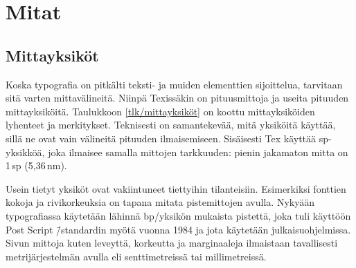 \section{Mitat}
\label{luku/mitat}

\subsection{Mittayksiköt}

Koska typografia on pitkälti teksti- ja muiden elementtien sijoittelua,
tarvitaan sitä varten mittavälineitä. Niinpä Texissäkin on pituusmittoja
ja useita pituuden mittayksiköitä. Taulukkoon \ref{tlk/mittayksiköt} on
koottu mittayksiköiden lyhenteet ja merkitykset. Teknisesti on
samantekevää, mitä yksiköitä käyttää, sillä ne ovat vain välineitä
pituuden ilmaisemiseen. Sisäisesti Tex käyttää sp-yksikköä, joka
ilmaisee samalla mittojen tarkkuuden: pienin jakamaton mitta on 1\,sp
(5,36\,nm).


Usein tietyt yksiköt ovat vakiintuneet tiettyihin tilanteisiin.
Esimerkiksi fonttien kokoja ja rivikorkeuksia on tapana mitata
pistemittojen avulla. Nykyään typografiassa käytetään lähinnä
bp\-/yksikön mukaista pistettä, joka tuli käyttöön Post Script
\=/standardin myötä vuonna 1984 ja jota käytetään julkaisuohjelmissa.
Sivun mittoja kuten leveyttä, korkeutta ja marginaaleja ilmaistaan
tavallisesti metrijärjestelmän avulla eli senttimetreissä tai
millimetreissä.

